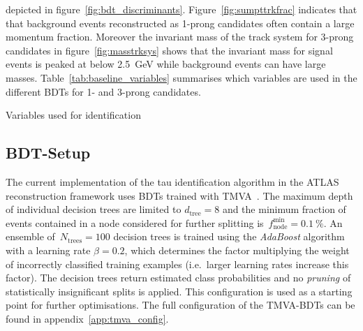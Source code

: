 depicted in figure~\ref{fig:bdt_discriminants}. Figure~\ref{fig:sumpttrkfrac}
indicates that that background events reconstructed as 1-prong candidates often
contain a large momentum fraction. Moreover the invariant mass of the track
system for 3-prong candidates in figure~\ref{fig:masstrksys} shows that the
invariant mass for signal events is peaked at below \SI{2.5}{\giga\electronvolt}
while background events can have large masses.
Table~\ref{tab:baseline_variables} summarises which variables are used in the
different BDTs for 1- and 3-prong candidates.
\begin{table}[htb]
  \centering
  
  \caption{Variables used for identification}
  \label{tab:baseline_variables}
\end{table}


\subsection{BDT-Setup}
The current implementation of the tau identification algorithm in the ATLAS
reconstruction framework uses BDTs trained with TMVA~\cite{tmva}.  The maximum depth
of individual decision trees are limited to $d_\text{tree} = 8$ and the minimum
fraction of events contained in a node considered for further splitting
is~$f_\text{node}^\text{min} = \SI{0.1}{\percent}$. An ensemble
of~$N_\text{trees} = 100$ decision trees is trained using the \emph{AdaBoost}
algorithm with a learning rate $\beta = 0.2$, which determines the factor
multiplying the weight of incorrectly classified training examples (i.e.\ larger
learning rates increase this factor). The decision trees return estimated class
probabilities and no \emph{pruning} of statistically insignificant splits is
applied. This configuration is used as a starting point for further
optimisations. The full configuration of the TMVA-BDTs can be found in
appendix~\ref{app:tmva_config}.


